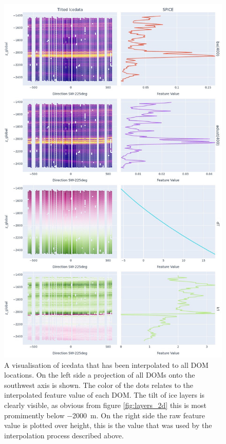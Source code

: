 \documentclass[a4paper,10pt]{scrartcl}
\begin{document}
\begin{figure}[H]
    \includegraphics[scale=0.40]{images/feature_2d.jpg}
    \centering
    \caption{
        A visualisation of icedata that has been interpolated to all DOM locations.
        On the left side a projection of all DOMs onto the southwest axis is shown.
        The color of the dots relates to the interpolated feature value of each DOM.
        The tilt of ice layers is clearly visible, as obvious from figure \ref{fig:layers_2d} this is most promimently below \SI{-2000}{m}.
        On the right side the raw feature value is plotted over height, this is the value that was used by the interpolation process described above.
    }
    \label{fig:features_2d}
\end{figure}
\end{document}
